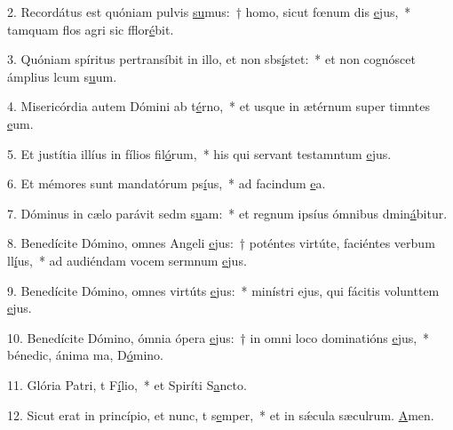 2. Recordátus est quóniam pulvis \uline{su}mus:~† homo, sicut fœnum dis \uline{e}jus,~* tamquam flos agri sic fflor\uline{é}bit.\par 
3. Quóniam spíritus pertransíbit in illo, et non sbs\uline{í}stet:~* et non cognóscet ámplius lcum s\uline{u}um.\par 
4. Misericórdia autem Dómini ab t\uline{é}rno,~* et usque in ætérnum super timntes \uline{e}um.\par 
5. Et justítia illíus in fílios fil\uline{ó}rum,~* his qui servant testamntum \uline{e}jus.\par 
6. Et mémores sunt mandatórum ps\uline{í}us,~* ad facindum \uline{e}a.\par 
7. Dóminus in cælo parávit sedm s\uline{u}am:~* et regnum ipsíus ómnibus dmin\uline{á}bitur.\par 
8. Benedícite Dómino, omnes Angeli \uline{e}jus:~† poténtes virtúte, faciéntes verbum ll\uline{í}us,~* ad audiéndam vocem sermnum \uline{e}jus.\par 
9. Benedícite Dómino, omnes virtúts \uline{e}jus:~* minístri ejus, qui fácitis volunttem \uline{e}jus.\par 
10. Benedícite Dómino, ómnia ópera \uline{e}jus:~† in omni loco dominatións \uline{e}jus,~* bénedic, ánima ma, D\uline{ó}mino.\par 
11. Glória Patri, t F\uline{í}lio,~* et Spiríti S\uline{a}ncto.\par 
12. Sicut erat in princípio, et nunc, t s\uline{e}mper,~* et in sǽcula sæculrum. \uline{A}men.\par 
